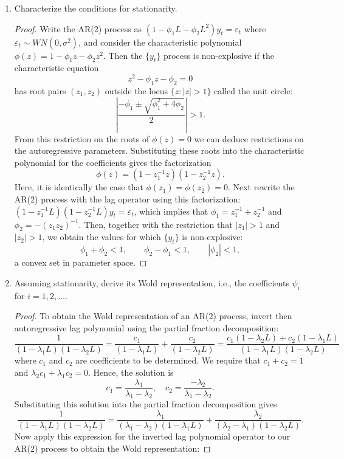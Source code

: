 \documentclass[oneside,reqno]{amsart}
\newcommand{\eps}{\varepsilon}
\theoremstyle{definition}
\begin{document}
\begin{enumerate}
\item
Characterize the conditions for stationarity. 
\begin{proof}
Write the AR(2) process as $(1 - \phi_1 L -  \phi_2 L^2)y_t =  \eps_t$ where $\eps_t \sim WN(0, \sigma^2)$, and consider the characteristic polynomial $\phi(z) = 1 - \phi_1 z - \phi_2 z^2$. Then the $\{y_t\}$ process is non-explosive if the characteristic equation 
\[
	z^2 -\phi_1 z - \phi_2 = 0
\]
has root pairs $(z_1,z_2)$ outside the locus $\{z : |z| > 1\}$ called the unit circle:
\[
	\left| \frac{-\phi_1 \pm \sqrt{\phi_1^2 + 4\phi_2}}{2} \right| > 1.
\]
From this restriction on the roots of $\phi(z)=0$ we can deduce restrictions on the autoregressive parameters. Substituting these roots into the characteristic polynomial for the coefficients gives the factorization 
\[
	\phi(z) = (1- z_1^{-1}z)(1- z_2^{-1}z).
\]
Here, it is identically the case that $\phi(z_1) = \phi(z_2) = 0$. Next rewrite the AR(2) process with the lag operator using this factorization: $(1- z_1^{-1}L)(1- z_2^{-1}L)y_t = \eps_t$, which implies that $\phi_1 = z_1^{-1}+ z_2^{-1}$ and $\phi_2 =-(z_1z_2)^{-1}$. Then, together with the restriction that $|z_1| > 1$ and $|z_2|>1$, we obtain the values for which $\{y_t\}$ is non-explosive:
\[
	\phi_1 + \phi_2 < 1, \qquad \phi_2 - \phi_1 < 1, \qquad |\phi_2| < 1,
\]
a convex set in parameter space. 
\end{proof}
\item
Assuming stationarity, derive its Wold representation, i.e., the coefficients $\psi_i$ for $i=1,2,\dotsc$.
\begin{proof}
To obtain the Wold representation of an AR(2) process, invert then autoregressive lag polynomial using the partial fraction decomposition:
\[
	\frac{1}{(1-\lambda_1 L ) (1-\lambda_2 L)} = \frac{c_1}{(1-\lambda_1 L )} + \frac{c_2}{(1-\lambda_2 L)} = \frac{c_1(1-\lambda_2 L) + c_2 (1-\lambda_1 L)}{(1-\lambda_1 L ) (1-\lambda_2 L)}
\]
where $c_1$ and $c_2$ are coefficients to be determined. We require that $c_1 + c_2 = 1$ and $\lambda_2 c_1 + \lambda_1 c_2 = 0$. Hence, the solution is 
\[
	c_1 = \frac{\lambda_1}{\lambda_1 - \lambda_2}, \quad c_2 = \frac{-\lambda_2}{\lambda_1 - \lambda_2}.
\]
Substituting this solution into the partial fraction decomposition gives  
\[
	\frac{1}{(1-\lambda_1 L ) (1-\lambda_2 L)} = 	\frac{\lambda_1}{(\lambda_1 -\lambda_2) (1-\lambda_1 L)} 
+ \frac{\lambda_2}{(\lambda_2 -\lambda_1) (1-\lambda_2 L)}.
\]
Now apply this expression for the inverted lag polynomial operator to our AR(2) process to obtain the Wold representation:

\end{proof}
\end{enumerate}
\end{document}
